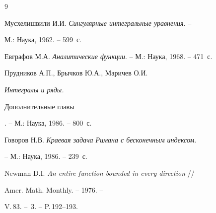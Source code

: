\begin{thebibliography}{9} 


 




Мусхелишвили И.И. {\em Сингулярные интегральные уравнения}. -- 


М.: Наука, 1962. -- 599~с. 




Евграфов М.А. {\em Аналитические функции}. -- М.: Наука, 1968. -- 471~с. 




Прудников А.П., Брычков Ю.А., Маричев О.И. {\em Интегралы и ряды. 


Дополнительные главы}. -- М.: Наука, 1986. -- 800~с. 




Говоров Н.В. {\em Краевая задача Римана с бесконечным индексом}. 


-- М.: Наука, 1986. -- 239~с. 




Newman D.I. {\em An entire function bounded in every direction} // 


Amer. Math. Monthly. -- 1976. -- 


V.\,83. -- \No\,3. -- P.\,192--193. 


 


\end{thebibliography} 


 


\vskip 2cm 


 






\smallskip 






 


\label{end} 


 


